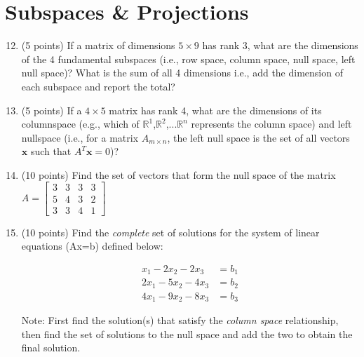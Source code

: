 \documentclass{article}%
\begin{document}
\section*{Subspaces \& Projections}
\begin{enumerate}
    \setcounter{enumi}{11}
        \item (5 points) If a matrix of dimensions $5 \times 9$ has rank 3, what are the dimensions of the 4 fundamental subspaces (i.e., row space, column space, null space, left null space)? What is the sum of all 4 dimensions i.e., add the dimension of each subspace and report the total?


        
        \item (5 points) If a $4 \times 5$ matrix has rank 4, what are the dimensions of its columnspace (e.g., which of $\mathbb{R}^{1}$,$\mathbb{R}^{2}$,...$\mathbb{R}^{n}$ represents the column space) and left nullspace (i.e., for a matrix $A_{m\times n}$, the left null space is the set of all vectors $\mathbf{x}$ such that $A^T\mathbf{x} = 0$)?


    
    \item (10 points) Find the set of vectors that form the null space of the matrix\hspace{0.4ex}
       $A =  \begin{bmatrix}
        3 & 3 & 3 & 3 \\
        5 & 4 & 3 & 2 \\
        3 & 3 & 4 & 1
    \end{bmatrix}$


    
    \item (10 points) Find the \emph{complete} set of solutions for the system of linear equations (Ax=b) defined below:

    \begin{align*}
        x_1 -2x_2 -2x_3 &= b_1\\
        2x_1 - 5x_2 -4x_3 &= b_2\\
        4x_1 - 9x_2 -8x_3 &= b_3
    \end{align*}

    Note: First find the solution(s) that satisfy the \emph{column space} relationship, then find the set of solutions to the null space and add the two to obtain the final solution.


\end{enumerate}
\end{document}

